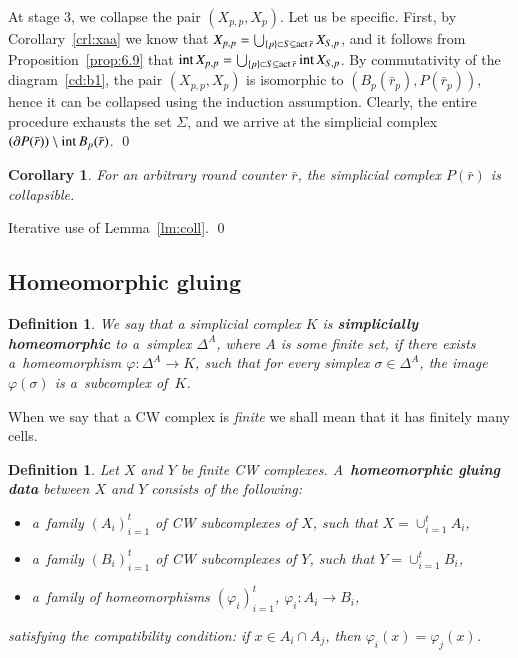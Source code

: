 \documentclass{amsart}[10pt]
\newtheorem{df}[theorem]{Definition}
\newtheorem{crl}[theorem]{Corollary}
\newcommand{\pr}{\nin{\bf Proof.} }
\newcommand{\act}{\text{\rm act}\,}
\newcommand{\da}{\Delta}
\newcommand{\inte}{\text{\rm int}\,}
\newcommand{\ra}{\rightarrow}
\newcommand{\sm}{\setminus}
\newcommand{\tr}{{\bar r}}
\numberwithin{equation}{section}
\numberwithin{figure}{section}
\numberwithin{table}{section}
\begin{document}
At stage 3, we collapse the pair $(X_{p,p},X_p)$. Let us be specific. 
First, by Corollary~\ref{crl:xaa} we know that 
$X_{p,p}=\bigcup_{\{p\}\subset S\subseteq\act\tr}X_{S,p}$, and 
it follows from Proposition~\ref{prop:6.9} that 
$\inte X_{p,p}=\bigcup_{\{p\}\subset S\subseteq\act\tr}\inte X_{S,p}$. 
By commutativity of the diagram~\eqref{cd:b1}, the pair $(X_{p,p},X_p)$
is isomorphic to $(B_p(\tr_p),P(\tr_p))$, hence it can be collapsed
using the induction assumption. Clearly, the entire procedure exhausts
the set $\Sigma$, and we arrive at the simplicial complex 
$(\partial P(\tr))\sm\inte B_p(\tr)$.
\qed

\begin{crl}
For an arbitrary round counter $\tr$, the simplicial complex $P(\tr)$
is collapsible.
\end{crl}
\pr Iterative use of Lemma~\ref{lm:coll}. 
\qed

\subsection{Homeomorphic gluing}

\begin{df}
We say that a simplicial complex $K$ is {\bf simplicially homeomorphic}
to a~simplex $\Delta^A$, where $A$ is some finite set, if there exists 
a~homeomorphism $\varphi:\da^A\ra K$, such that for every simplex 
$\sigma\in\da^A$, the image $\varphi(\sigma)$ is a~subcomplex of~$K$.
\end{df}

When we say that a CW complex is {\it finite} we shall mean that it has
finitely many cells.

\begin{df}\label{df:gd}
 Let $X$ and $Y$ be finite CW complexes. A~{\bf homeomorphic gluing
   data} between $X$ and $Y$ consists of the following:
\begin{itemize}
\item a~family $(A_i)_{i=1}^t$ of CW subcomplexes of $X$, such that
  $X=\cup_{i=1}^t A_i$,
\item a~family $(B_i)_{i=1}^t$ of CW subcomplexes of $Y$, such that
  $Y=\cup_{i=1}^t B_i$,
\item a~family of homeomorphisms $(\varphi_i)_{i=1}^t$,
  $\varphi_i:A_i\rightarrow B_i$,
\end{itemize}
satisfying the compatibility condition: if $x\in A_i\cap A_j$, then
$\varphi_i(x)=\varphi_j(x)$.
\end{df}
\end{document}
